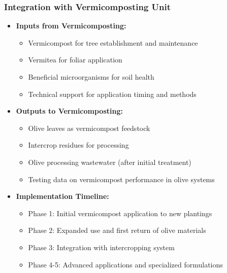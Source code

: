 \subsubsection{Integration with Vermicomposting Unit}
\begin{itemize}
    \item \textbf{Inputs from Vermicomposting:}
    \begin{itemize}
        \item Vermicompost for tree establishment and maintenance
        \item Vermitea for foliar application
        \item Beneficial microorganisms for soil health
        \item Technical support for application timing and methods
    \end{itemize}
    
    \item \textbf{Outputs to Vermicomposting:}
    \begin{itemize}
        \item Olive leaves as vermicompost feedstock
        \item Intercrop residues for processing
        \item Olive processing wastewater (after initial treatment)
        \item Testing data on vermicompost performance in olive systems
    \end{itemize}
    
    \item \textbf{Implementation Timeline:}
    \begin{itemize}
        \item Phase 1: Initial vermicompost application to new plantings
        \item Phase 2: Expanded use and first return of olive materials
        \item Phase 3: Integration with intercropping system
        \item Phase 4-5: Advanced applications and specialized formulations
    \end{itemize}
\end{itemize}

